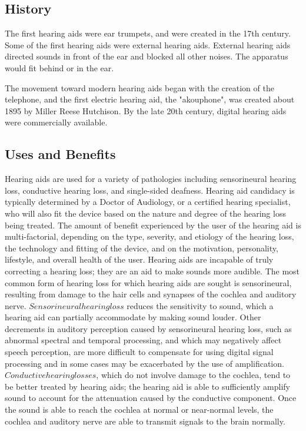 \documentclass[12pt]{article}
\begin{document}
\subsection{History}
The first hearing aids were ear trumpets, and were created in the 17th century. Some of the first hearing aids were external hearing aids. External hearing aids directed sounds in front of the ear and blocked all other noises. The apparatus would fit behind or in the ear.

The movement toward modern hearing aids began with the creation of the telephone, and the first electric hearing aid, the "akouphone", was created about 1895 by Miller Reese Hutchison. By the late 20th century, digital hearing aids were commercially available.\\
\subsection{Uses and Benefits}
Hearing aids are used for a variety of pathologies including sensorineural hearing loss, conductive hearing loss, and single-sided deafness. Hearing aid candidacy is typically determined by a Doctor of Audiology, or a certified hearing specialist, who will also fit the device based on the nature and degree of the hearing loss being treated. The amount of benefit experienced by the user of the hearing aid is multi-factorial, depending on the type, severity, and etiology of the hearing loss, the technology and fitting of the device, and on the motivation, personality, lifestyle, and overall health of the user.
Hearing aids are incapable of truly correcting a hearing loss; they are an aid to make sounds more audible. The most common form of hearing loss for which hearing aids are sought is sensorineural, resulting from damage to the hair cells and synapses of the cochlea and auditory nerve. $Sensorineural hearing loss$ reduces the sensitivity to sound, which a hearing aid can partially accommodate by making sound louder. Other decrements in auditory perception caused by sensorineural hearing loss, such as abnormal spectral and temporal processing, and which may negatively affect speech perception, are more difficult to compensate for using digital signal processing and in some cases may be exacerbated by the use of amplification.
$Conductive hearing losses$, which do not involve damage to the cochlea, tend to be better treated by hearing aids; the hearing aid is able to sufficiently amplify sound to account for the attenuation caused by the conductive component. Once the sound is able to reach the cochlea at normal or near-normal levels, the cochlea and auditory nerve are able to transmit signals to the brain normally.
\end{document}

